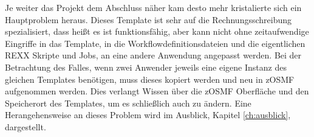 Je weiter das Projekt dem Abschluss näher kam desto mehr kristalierte sich ein Hauptproblem heraus.
Dieses Template ist sehr auf die Rechnungsschreibung spezialisiert, dass heißt es ist funktionsfähig, aber kann nicht ohne zeitaufwendige Eingriffe in das Template, in die Workflowdefinitionsdateien und die eigentlichen REXX Skripte und Jobs, an eine andere Anwendung angepasst werden.
Bei der Betrachtung des Falles, wenn zwei Anwender jeweils eine eigene Instanz des gleichen Templates benötigen, muss dieses kopiert werden und neu in zOSMF aufgenommen werden.
Dies verlangt Wissen über die zOSMF Oberfläche und den Speicherort des Templates, um es schließlich auch zu ändern.
Eine Herangehensweise an dieses Problem wird im Ausblick, Kapitel \ref{ch:ausblick}, dargestellt.

